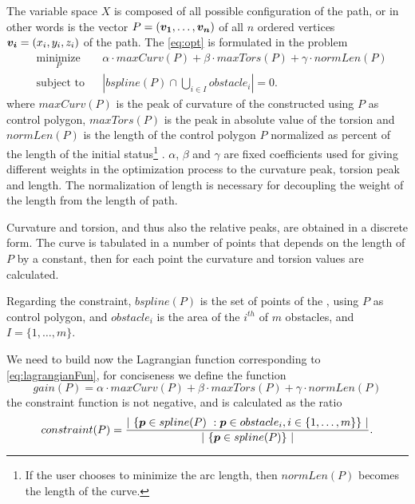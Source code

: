 \documentclass[dissertation.tex]{subfiles}
\begin{document}
The variable space $X$ is composed of all possible
configuration of the path, or in other words is the vector
$P=(\boldsymbol{v_1},\dots,\boldsymbol{v_n})$ of all $n$ ordered
vertices $\boldsymbol{v_i}=(x_i,y_i,z_i)$ of the
path. The \cref{eq:opt} is formulated in the problem
\begin{equation*}
  \begin{aligned}
    & \underset{P}{\text{minimize}}
    & & \alpha\cdot maxCurv(P)+\beta\cdot
    maxTors(P)+\gamma\cdot normLen(P) \\
    & \text{subject to}
    & & \left|bspline(P)\cap \bigcup_{i\in I}obstacle_i\right| = 0.
  \end{aligned}
\end{equation*}
where $maxCurv(P)$ is the peak of curvature of the \bs
constructed using $P$ as control polygon,
$maxTors(P)$ is the peak in absolute value of the torsion and
$normLen(P)$ is the length of the control polygon
$P$ normalized as percent of the length of the initial
status\footnote{If the user chooses to minimize the
  arc length, then $normLen(P)$ becomes the length of the \bs curve.}
. $\alpha$, $\beta$ and $\gamma$ are fixed
coefficients used for giving different weights in the optimization
process to 
the curvature peak, torsion peak and length. The normalization of
length is necessary for decoupling the weight of the length from the
length of path.

Curvature and torsion, and thus also the
relative peaks, are obtained in a discrete form. The \bs curve is
tabulated in a number of points that depends on the length of $P$
by a constant, then for each point the curvature and torsion values
are calculated.

Regarding the constraint, $bspline(P)$
is the set of points of the \emph{\bs}, using $P$ as 
control polygon, and 
$obstacle_i$ is the area of the $i^{th}$ of $m$ obstacles, and
$I=\{1,\dots,m\}$.

We need to build now the Lagrangian function corresponding to
\cref{eq:lagrangianFun}, for conciseness we define the function
\begin{equation}\label{eq:gainLag}
  gain(P) = \alpha\cdot maxCurv(P)+\beta\cdot
    maxTors(P)+\gamma\cdot normLen(P)
\end{equation}
the constraint function is not negative, and is calculated as the
ratio
\begin{equation}\label{eq:constraintLag}
constraint(P) = \frac{\left|\ \{\boldsymbol{p} \in spline(P)\ : \boldsymbol{p}\in
    obstacle_i, i\in\{1,\dots,m\}\}\ \right|}{\left|\ \{\boldsymbol{p} \in
    spline(P)\}\ \right|}.
\end{equation}
\end{document}
